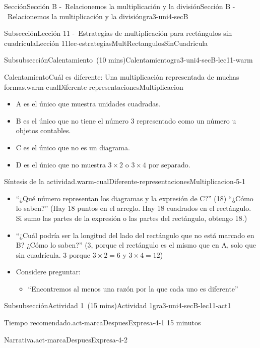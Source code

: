 \documentclass[oneside,10pt,]{article}
\begin{document}
\begin{sectionptx}{Sección}{Sección B -~Relacionemos la multiplicación y la división}{}{Sección B -~Relacionemos la multiplicación y la división}{}{}{gra3-uni4-secB}
\begin{subsectionptx}{Subsección}{Lección 11 -~Estrategias de multiplicación para rectángulos sin cuadrícula}{}{Lección 11}{}{}{lec-estrategiasMultRectangulosSinCuadricula}
\begin{subsubsectionptx}{Subsubsección}{Calentamiento~(10 mins)}{}{Calentamiento}{}{}{gra3-uni4-secB-lec11-warm}
\begin{exploration}{Calentamiento}{Cuál es diferente: Una multiplicación representada de muchas formas.}{warm-cualDiferente-representacionesMultiplicacion}
\begin{itemize}[label=\textbullet]
\item{}A es el único que muestra unidades cuadradas.%
\item{}B es el único que no tiene el número 3 representado como un número u objetos contables.%
\item{}C es el único que no es un diagrama.%
\item{}D es el único que no muestra \(3 \times 2\) o \(3 \times 4\) por separado.%
\end{itemize}
\end{exploration}%
\par
\begin{paragraphs}{Síntesis de la actividad.}{warm-cualDiferente-representacionesMultiplicacion-5-1}%
%
\begin{itemize}[label=\textbullet]
\item{}``¿Qué número representan los diagramas y la expresión de C?'' (18) ``¿Cómo lo saben?'' (Hay 18 puntos en el arreglo. Hay 18 cuadrados en el rectángulo. Si sumo las partes de la expresión o las partes del rectángulo, obtengo 18.)%
\item{}``¿Cuál podría ser la longitud del lado del rectángulo que no está marcado en B? ¿Cómo lo saben?'' (3, porque el rectángulo es el mismo que en A, solo que sin cuadrícula. 3 porque \(3\times 2 = 6\) y \(3 \times 4 = 12\))%
\item{}Considere preguntar:%
%
\begin{itemize}[label=$\circ$]
\item{}``Encontremos al menos una razón por la que cada uno es diferente''%
\end{itemize}
\end{itemize}
\end{paragraphs}%
\end{subsubsectionptx}
%
%
\typeout{************************************************}
\typeout{************************************************}
%
\begin{subsubsectionptx}{Subsubsección}{Actividad 1~(15 mins)}{}{Actividad 1}{}{}{gra3-uni4-secB-lec11-act1}
\par
\begin{paragraphs}{Tiempo recomendado.}{act-marcaDespuesExpresa-4-1}%
15 minutos%
\end{paragraphs}%
\begin{paragraphs}{Narrativa.}{act-marcaDespuesExpresa-4-2}%

\end{paragraphs}
\end{subsubsectionptx}
\end{subsectionptx}
\end{sectionptx}
\end{document}
